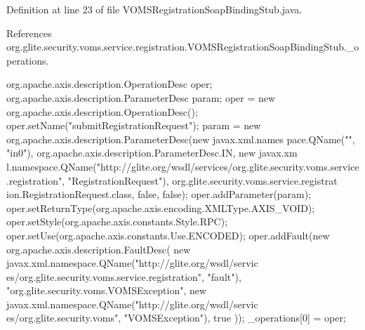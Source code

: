 Definition at line 23 of file VOMSRegistrationSoapBindingStub.java.



References org.glite.security.voms.service.registration.VOMSRegistrationSoapBindingStub.\_\-operations.


\begin{DoxyCode}
                                             {
        org.apache.axis.description.OperationDesc oper;
        org.apache.axis.description.ParameterDesc param;
        oper = new org.apache.axis.description.OperationDesc();
        oper.setName("submitRegistrationRequest");
        param = new org.apache.axis.description.ParameterDesc(new javax.xml.names
      pace.QName("", "in0"), org.apache.axis.description.ParameterDesc.IN, new javax.xm
      l.namespace.QName("http://glite.org/wsdl/services/org.glite.security.voms.service
      .registration", "RegistrationRequest"), org.glite.security.voms.service.registrat
      ion.RegistrationRequest.class, false, false);
        oper.addParameter(param);
        oper.setReturnType(org.apache.axis.encoding.XMLType.AXIS_VOID);
        oper.setStyle(org.apache.axis.constants.Style.RPC);
        oper.setUse(org.apache.axis.constants.Use.ENCODED);
        oper.addFault(new org.apache.axis.description.FaultDesc(
                      new javax.xml.namespace.QName("http://glite.org/wsdl/servic
      es/org.glite.security.voms.service.registration", "fault"),
                      "org.glite.security.voms.VOMSException",
                      new javax.xml.namespace.QName("http://glite.org/wsdl/servic
      es/org.glite.security.voms", "VOMSException"), 
                      true
                     ));
        _operations[0] = oper;

}
\end{DoxyCode}

